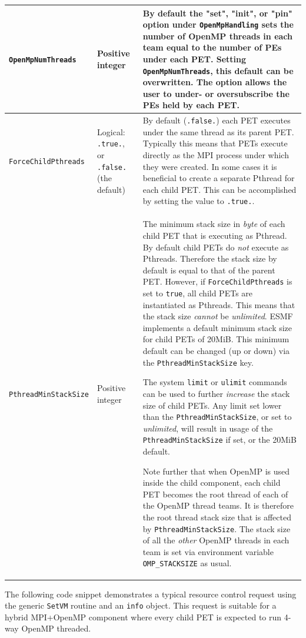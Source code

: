 \begin{longtable}[h]{|p{}|p{}|p{}|}
     {\tt OpenMpNumThreads} & Positive integer   &
        By default the "set", "init", or "pin" option under {\tt OpenMpHandling} sets the number of OpenMP threads in each team equal to the number of PEs under each PET. Setting {\tt OpenMpNumThreads}, this default can be overwritten. The option allows the user to under- or oversubscribe the PEs held by each PET.\\ \hline
        
     {\tt ForceChildPthreads}     & Logical: {\tt .true.}, or {\tt .false.} (the default) &
        By default ({\tt .false.}) each PET executes under the same thread as its parent PET. Typically this means that PETs execute directly as the MPI process under which they were created. In some cases it is beneficial to create a separate Pthread for each child PET. This can be accomplished by setting the value to {\tt .true.}.
        \\ \hline

     {\tt PthreadMinStackSize}     & Positive integer   &
        The minimum stack size in {\em byte} of each child PET that is executing as Pthread. By default child PETs do {\em not} execute as Pthreads. Therefore the stack size by default is equal to that of the parent PET. However, if {\tt ForceChildPthreads} is set to {\tt true}, all child PETs are instantiated as Pthreads. This means that the stack size {\em cannot} be {\em unlimited}. ESMF implements a default minimum stack size for child PETs of 20MiB. This minimum default can be changed (up or down) via the {\tt PthreadMinStackSize} key.
        
        The system {\tt limit} or {\tt ulimit} commands can be used to further {\em increase} the stack size of child PETs. Any limit set lower than the {\tt PthreadMinStackSize}, or set to {\em unlimited}, will result in usage of the {\tt PthreadMinStackSize} if set, or the 20MiB default.
        
        Note further that when OpenMP is used inside the child component, each child PET becomes the root thread of each of the OpenMP thread teams. It is therefore the root thread stack size that is affected by {\tt PthreadMinStackSize}. The stack size of all the {\em other} OpenMP threads in each team is set via environment variable {\tt OMP\_STACKSIZE} as usual.
        \\ \hline\hline

\end{longtable}

The following code snippet demonstrates a typical resource control request using the generic {\tt SetVM} routine and an {\tt info} object. This request is suitable for a hybrid MPI+OpenMP component where every child PET is expected to run 4-way OpenMP threaded.

